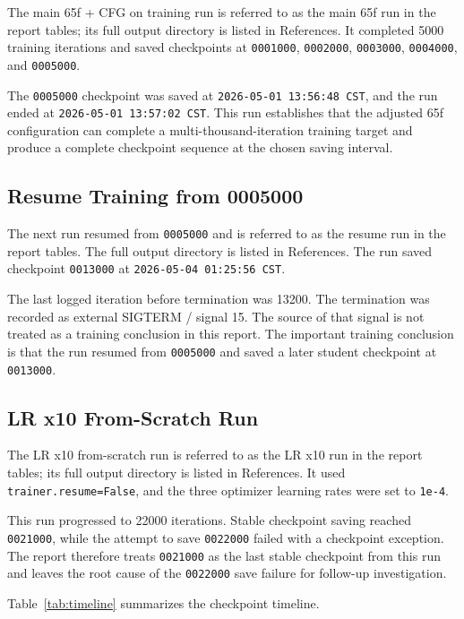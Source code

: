 \documentclass[12pt,a4paper]{article}
\begin{document}
The main 65f + CFG on training run is referred to as the main 65f run in the report tables; its full output directory is listed in References. It completed 5000 training iterations and saved checkpoints at \texttt{0001000}, \texttt{0002000}, \texttt{0003000}, \texttt{0004000}, and \texttt{0005000}.

The \texttt{0005000} checkpoint was saved at \texttt{2026-05-01 13:56:48 CST}, and the run ended at \texttt{2026-05-01 13:57:02 CST}. This run establishes that the adjusted 65f configuration can complete a multi-thousand-iteration training target and produce a complete checkpoint sequence at the chosen saving interval.

\subsection{Resume Training from 0005000}

The next run resumed from \texttt{0005000} and is referred to as the resume run in the report tables. The full output directory is listed in References. The run saved checkpoint \texttt{0013000} at \texttt{2026-05-04 01:25:56 CST}.

The last logged iteration before termination was 13200. The termination was recorded as external SIGTERM / signal 15. The source of that signal is not treated as a training conclusion in this report. The important training conclusion is that the run resumed from \texttt{0005000} and saved a later student checkpoint at \texttt{0013000}.

\subsection{LR x10 From-Scratch Run}

The LR x10 from-scratch run is referred to as the LR x10 run in the report tables; its full output directory is listed in References. It used \texttt{trainer.resume=False}, and the three optimizer learning rates were set to \texttt{1e-4}.

This run progressed to 22000 iterations. Stable checkpoint saving reached \texttt{0021000}, while the attempt to save \texttt{0022000} failed with a checkpoint exception. The report therefore treats \texttt{0021000} as the last stable checkpoint from this run and leaves the root cause of the \texttt{0022000} save failure for follow-up investigation.

Table~\ref{tab:timeline} summarizes the checkpoint timeline.
\end{document}
